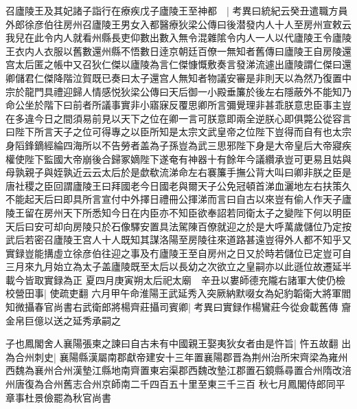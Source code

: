 召廬陵王及其妃諸子詣行在療疾戊子廬陵王至神都　|{
	考異曰統紀云癸丑遣職方員外郎徐彦伯往房州召廬陵王男女入都醫療狄梁公傳曰後潜發内人十人至房州宣敕云我兒在此令内人就看州縣長吏仰數出數入無令混雜隂令内人一人以代廬陵王令廬陵王衣内人衣服以舊數還州縣不悟數日逹京朝廷百僚一無知者舊傳曰廬陵王自房陵還宫太后匿之帳中又召狄仁傑以廬陵為言仁傑慷慨敷奏言發涕流遽出廬陵謂仁傑曰還卿儲君仁傑降階泣賀既已奏曰太子還宫人無知者物議安審是非則天以為然乃復置中宗於龍門具禮迎歸人情感悦狄梁公傳曰天后御一小殿垂簾於後左右隱蔽外不能知乃命公坐於階下曰前者所議事實非小寤寐反覆思卿所言彌覺理非甚乖朕意忠臣事主豈在多違今日之間須易前見以天下之位在卿一言可朕意即兩全逆朕心即俱斃公從容言曰陛下所言天子之位可得專之以臣所知是太宗文武皇帝之位陛下豈得而自有也太宗身䧟鋒鏑經綸四海所以不告勞者盖為子孫豈為武三思邪陛下身是大帝皇后大帝寢疾權使陛下監國大帝崩後合歸冢嫡陛下遂奄有神器十有餘年今議纘承豈可更易且姑與母孰親子與姪孰近云云太后於是歔欷流涕命左右褰簾手撫公背大叫曰卿非朕之臣是唐社稷之臣回謂廬陵王曰拜國老今日國老與爾天子公免冠頓首涕血灑地左右扶策久不能起天后曰即具所言宣付中外擇日禮冊公揮涕而言曰自古以來豈有偷人作天子廬陵王留在房州天下所悉知今日在内臣亦不知臣欲奉詔若同衛太子之變陛下何以明臣天后曰安可却向房陵只於石像驛安置具法駕陳百僚就迎之於是大呼萬歲儲位乃定按武后若密召廬陵王宫人十人既知其謀洛陽至房陵往來道路甚遠豈得外人都不知乎又實録豈能搆虛立徐彦伯往迎之事及冇廬陵王至自房州之日又於時若儲位已定豈可自三月來九月始立為太子盖廬陵既至太后以長幼之次欲立之皇嗣亦以此遜位故遷延半載今皆取實録為正}
夏四月庚寅朔太后祀太廟　辛丑以婁師德充隴右諸軍大使仍檢校營田事|{
	使疏吏翻}
六月甲午命淮陽王武延秀入突厥納默啜女為妃豹韜衛大將軍閻知微攝春官尚書右武衛郎將楊齊莊攝司賓卿|{
	考異曰實録作楊鸞莊今從僉載舊傳}
齎金帛巨億以送之延秀承嗣之

子也鳳閣舍人襄陽張柬之諫曰自古未有中國親王娶夷狄女者由是忤旨|{
	忤五故翻}
出為合州刺史|{
	襄陽縣漢屬南郡獻帝建安十三年置襄陽郡晋為荆州治所宋齊梁為雍州西魏為襄州合州漢墊江縣地南齊置東宕渠郡西魏改墊江郡置石鏡縣尋置合州隋改涪州唐復為合州舊志合州京師南二千四百五十里至東三千三百}
秋七月鳳閣侍郎同平章事杜景儉罷為秋官尚書

